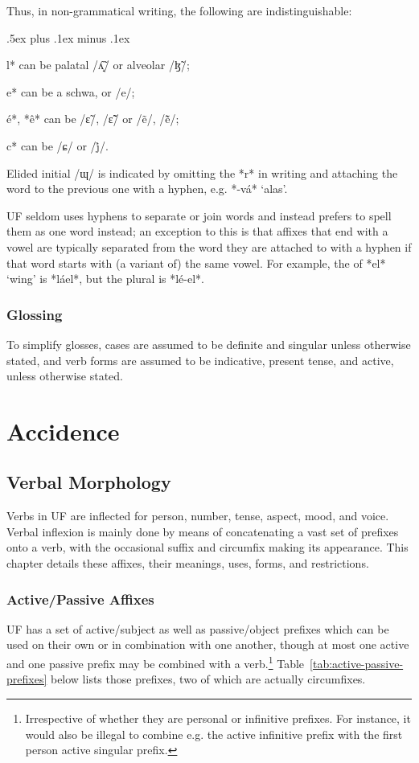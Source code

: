 \documentclass[a4paper, 12pt, oneside, final]{article}
\begin{document}
\noindent Thus, in non-grammatical writing, the following are indistinguishable:
\begin{items}\itemsep .5ex plus .1ex minus .1ex\relax
\item *l* can be palatal /ʎ̝̃/ or alveolar /ɮ̃/;
\item *e* can be a schwa, or /e/;
\item *é*, *ê* can be /ɛ̃/, /ɛ̃̃/ or /ẽ/, /ẽ̃/;
\item *c* can be /ɕ/ or /j̊/.
\end{items}

\noindent Elided initial /ɰ/ is indicated by omitting the *r* in writing and attaching the word to the previous one with a hyphen,
e.g. *-vá* ‘alas’.

UF seldom uses hyphens to separate or join words and instead prefers to spell them as one word instead; an exception
to this is that affixes that end with a vowel are typically separated from the word they are attached to with a hyphen
if that word starts with (a variant of) the same vowel. For example, the  of *el* ‘wing’
is *láel*, but the plural is *lé-el*.

\subsubsection{Glossing}
To simplify glosses, cases are assumed to be definite and singular unless otherwise stated, and verb forms are
assumed to be indicative, present tense, and active, unless otherwise stated.

\section{Accidence}\label{sec:accidence}
\subsection{Verbal Morphology}\label{subsec:verbal-morphology}
Verbs in UF are inflected for person, number, tense, aspect, mood, and voice. Verbal inflexion is mainly done
by means of concatenating a vast set of prefixes onto a verb, with the occasional suffix and circumfix making
its appearance. This chapter details these affixes, their meanings, uses, forms, and restrictions.


\subsubsection{Active/Passive Affixes}\label{subsubsec:active-passive-affixes}
UF has a set of active/subject as well as passive/object prefixes which can be used on their own or in combination
with one another, though at most one active and one passive prefix may be combined with a verb.\footnote{Irrespective
of whether they are personal or infinitive prefixes. For instance, it would also be illegal to combine e.g. the active
infinitive prefix with the first person active singular prefix.} Table~\ref{tab:active-passive-prefixes}
below lists those prefixes, two of which are actually circumfixes.
\end{document}
